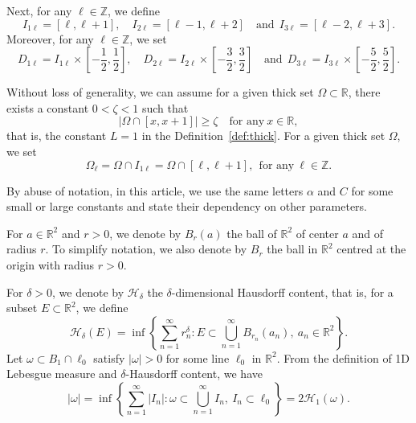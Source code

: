 \documentclass[a4paper,reqno]{amsart}
\theoremstyle{definition}
\numberwithin{equation}{section}
\newcommand{\R}{\mathbb{R}}
\def \R {{\mathbb{R} }}
\begin{document}
Next, for any $\ell\in \mathbb{Z}$, we define
\begin{equation*}
I_{1\ell}=[\ell,\ell+1],\quad I_{2\ell}=[\ell-1,\ell+2]\quad \mbox{and}\ \ I_{3\ell}=[\ell-2,\ell+3].
\end{equation*}
Moreover, for any $\ell\in \mathbb{Z}$, we set
\begin{equation*}
D_{1\ell}=I_{1\ell}\times \left[-\frac{1}{2},\frac{1}{2}\right],\quad 
D_{2\ell}=I_{2\ell}\times \left[-\frac{3}{2},\frac{3}{2}\right]
\quad \mbox{and}\ \ D_{3\ell}=I_{3\ell}\times \left[-\frac{5}{2},\frac{5}{2}\right].
\end{equation*}

\smallskip
Without loss of generality, we can assume for a given thick set $\Omega\subset \R$, there exists a constant $0<\zeta< 1$ such that
 \begin{equation*}
       \left|\Omega\cap [x,x+1]\right|\ge \zeta \quad \mbox{for any}\ x\in \R,
   \end{equation*}
   that is, the constant $L=1$ in the Definition~\ref{def:thick}. For a given thick set $\Omega$, we set
\begin{equation*}
    \Omega_{\ell}=\Omega \cap I_{1\ell}=\Omega\cap [\ell,\ell+1],\ \ \mbox{for any}\ \ell\in \mathbb{Z}.
\end{equation*}

By abuse of notation, in this article, we use the same letters $\alpha$ and $C$ for some small or large constants and state their dependency on other parameters.

\smallskip
For $a\in \R^{2}$ and $r>0$, we denote by $B_{r}(a)$ the ball of $\R^{2}$ of center $a$ and of radius $r$.
To simplify notation, we also denote by $B_{r}$ the ball in $\R^{2}$ centred at the origin with radius $r>0$. 

\smallskip
For $\delta>0$, we denote by $\mathcal{H}_{\delta}$ the $\delta$-dimensional Hausdorff content, that is, for a subset $E\subset \mathbb{R}^{2}$, we define
\begin{equation*}
    \mathcal{H}_{\delta}(E)=\inf\left\{\sum_{n=1}^{\infty}r_{n}^{\delta}:E\subset \bigcup_{n=1}^{\infty}B_{r_{n}}(a_{n}),\ a_{n}\in \R^{2}\right\}.
    \end{equation*} 
Let $\omega\subset B_{1}\cap{\ell_{0}}$ satisfy $|\omega|>0$ for some line $\ell_{0}$ in $\R^{2}$. From the definition of 1D Lebesgue measure and $\delta$-Hausdorff content, we have 
\begin{equation}\label{equ:measu}
    |\omega|=\inf\left\{\sum_{n=1}^{\infty}|I_{n}|:\omega\subset\bigcup_{n=1}^{\infty}I_{n},\ I_{n}\subset \ell_{0} \right\}=2\mathcal{H}_{1}(\omega).
\end{equation}
\end{document}
